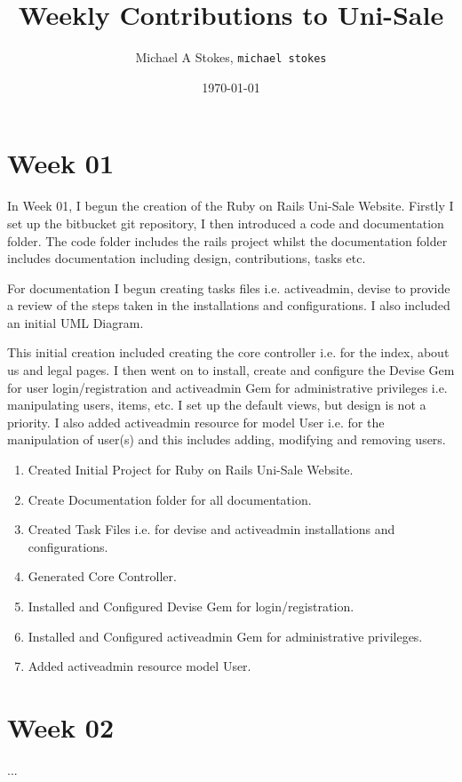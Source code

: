 \documentclass[11pt]{article}
\title{Weekly Contributions to Uni-Sale}
\author{Michael A Stokes, \texttt{michael stokes}}
\date{\today}
\begin{document}
\maketitle

\section{Week 01}
In Week 01, I begun the creation of the Ruby on Rails Uni-Sale Website.
Firstly I set up the bitbucket git repository, I then introduced a code and documentation folder.
The code folder includes the rails project whilst the documentation folder includes documentation including design, contributions, tasks etc.

For documentation I begun creating tasks files i.e. activeadmin, devise to provide a review of the steps taken in the installations and configurations.
I also included an initial UML Diagram.

This initial creation included creating the core controller i.e. for the index, about us and legal pages.
I then went on to install, create and configure the Devise Gem for user login/registration and activeadmin Gem 
for administrative privileges i.e. manipulating users, items, etc.
I set up the default views, but design is not a priority.
I also added activeadmin resource for model User i.e. for the manipulation of user(s) and this includes adding, modifying and removing users.

\begin{enumerate}
\item Created Initial Project for Ruby on Rails Uni-Sale Website.
\item Create Documentation folder for all documentation.
\item Created Task Files i.e. for devise and activeadmin installations and configurations.
\item Generated Core Controller.
\item Installed and Configured Devise Gem for login/registration.
\item Installed and Configured activeadmin Gem for administrative privileges.
\item Added activeadmin resource model User.
\end{enumerate}

\section{Week 02}
...
\end{document}
